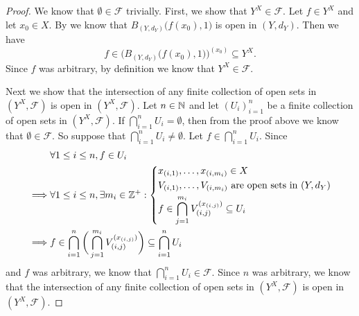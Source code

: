\begin{proof}
  We know that \(\emptyset \in \mathcal{F}\) trivially.
  First, we show that \(Y^X \in \mathcal{F}\).
  Let \(f \in Y^X\) and let \(x_0 \in X\).
  By  we know that \(B_{(Y, d_Y)}\big(f(x_0), 1\big)\) is open in \((Y, d_Y)\).
  Then we have
  \[
    f \in \Big(B_{(Y, d_Y)}\big(f(x_0), 1\big)\Big)^{(x_0)} \subseteq Y^X.
  \]
  Since \(f\) was arbitrary, by definition we know that \(Y^X \in \mathcal{F}\).

  Next we show that the intersection of any finite collection of open sets in \((Y^X, \mathcal{F})\) is open in \((Y^X, \mathcal{F})\).
  Let \(n \in \mathbb{N}\) and let \((U_i)_{i = 1}^n\) be a finite collection of open sets in \((Y^X, \mathcal{F})\).
  If \(\bigcap_{i = 1}^n U_i = \emptyset\), then from the proof above we know that \(\emptyset \in \mathcal{F}\).
  So suppose that \(\bigcap_{i = 1}^n U_i \neq \emptyset\).
  Let \(f \in \bigcap_{i = 1}^n U_i\).
  Since
  \begin{align*}
             & \forall 1 \leq i \leq n, f \in U_i                                                                                  \\
    \implies & \forall 1 \leq i \leq n, \exists m_i \in \mathbb{Z}^+ : \begin{dcases}
                                                                 x_{(i, 1)}, \dots, x_{(i, m_i)} \in X                              \\
                                                                 V_{(i, 1)}, \dots, V_{(i, m_i)} \text{ are open sets in } (Y, d_Y) \\
                                                                 f \in \bigcap_{j = 1}^{m_i} V_{(i, j)}^{(x_{(i, j)})} \subseteq U_i
                                                               \end{dcases}  \\
    \implies & f \in \bigcap_{i = 1}^n \bigg(\bigcap_{j = 1}^{m_i} V_{(i, j)}^{(x_{(i, j)})}\bigg) \subseteq \bigcap_{i = 1}^n U_i
  \end{align*}
  and \(f\) was arbitrary, we know that \(\bigcap_{i = 1}^n U_i \in \mathcal{F}\).
  Since \(n\) was arbitrary, we know that the intersection of any finite collection of open sets in \((Y^X, \mathcal{F})\) is open in \((Y^X, \mathcal{F})\).


\end{proof}
